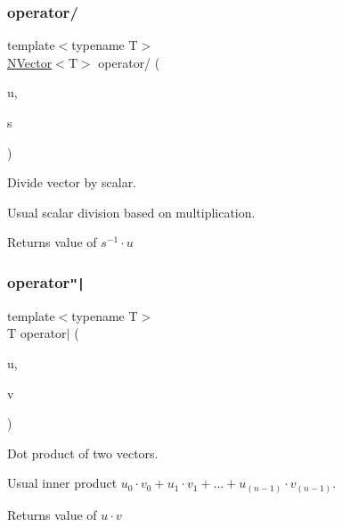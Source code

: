 \subsubsection{\texorpdfstring{operator/}{operator/}\hspace{0.1cm}{\footnotesize\ttfamily [1/2]}}
{\footnotesize\ttfamily template$<$typename T$>$ \\
\mbox{\hyperlink{class_n_vector}{N\+Vector}}$<$T$>$ operator/ (\begin{DoxyParamCaption}\item[{\mbox{\hyperlink{class_n_vector}{N\+Vector}}$<$ T $>$}]{u,  }\item[{T}]{s }\end{DoxyParamCaption})\hspace{0.3cm}{\ttfamily [friend]}}



Divide vector by scalar. 

Usual scalar division based on multiplication. \begin{DoxyReturn}{Returns}
value of $ s^{-1} \cdot u $ 
\end{DoxyReturn}
\mbox{\label{class_n_vector_a193c63fac7e6b9528c854fd94ee76030}} 
\subsubsection{\texorpdfstring{operator\texttt{"|}}{operator|}}
{\footnotesize\ttfamily template$<$typename T$>$ \\
T operator$\vert$ (\begin{DoxyParamCaption}\item[{const \mbox{\hyperlink{class_n_vector}{N\+Vector}}$<$ T $>$ \&}]{u,  }\item[{const \mbox{\hyperlink{class_n_vector}{N\+Vector}}$<$ T $>$ \&}]{v }\end{DoxyParamCaption})\hspace{0.3cm}{\ttfamily [friend]}}



Dot product of two vectors. 

Usual inner product $ u_0 \cdot v_0 + u_1 \cdot v_1 + ... + u_{(n-1)} \cdot v_{(n-1)} $. \begin{DoxyReturn}{Returns}
value of $ u \cdot v $ 
\end{DoxyReturn}
\mbox{\label{class_n_vector_a697b7e9e059d8045dc5f682f94521548}} 
